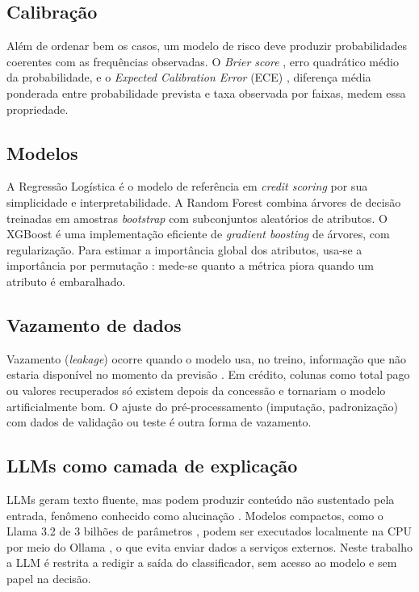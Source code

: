 \documentclass[12pt]{article}
\begin{document}
\subsection{Calibração}

Além de ordenar bem os casos, um modelo de risco deve produzir probabilidades
coerentes com as frequências observadas. O \textit{Brier score}
\cite{brier1950verification}, erro quadrático médio da probabilidade, e o
\textit{Expected Calibration Error} (ECE) \cite{naeini2015obtaining,guo2017calibration},
diferença média ponderada entre probabilidade prevista e taxa observada por
faixas, medem essa propriedade.

\subsection{Modelos}

A Regressão Logística \cite{hosmer2013applied} é o modelo de referência em
\textit{credit scoring} por sua simplicidade e interpretabilidade. A Random
Forest \cite{breiman2001random} combina árvores de decisão treinadas em amostras
\textit{bootstrap} com subconjuntos aleatórios de atributos. O XGBoost
\cite{chen2016xgboost} é uma implementação eficiente de \textit{gradient
boosting} de árvores, com regularização. Para estimar a importância global dos
atributos, usa-se a importância por permutação \cite{breiman2001random}: mede-se
quanto a métrica piora quando um atributo é embaralhado.

\subsection{Vazamento de dados}

Vazamento (\textit{leakage}) ocorre quando o modelo usa, no treino, informação
que não estaria disponível no momento da previsão \cite{kaufman2012leakage}. Em
crédito, colunas como total pago ou valores recuperados só existem depois da
concessão e tornariam o modelo artificialmente bom. O ajuste do
pré-processamento (imputação, padronização) com dados de validação ou teste é
outra forma de vazamento.

\subsection{LLMs como camada de explicação}

LLMs geram texto fluente, mas podem produzir conteúdo não sustentado pela
entrada, fenômeno conhecido como alucinação \cite{ji2023survey}. Modelos
compactos, como o Llama 3.2 de 3 bilhões de parâmetros
\cite{grattafiori2024llama}, podem ser executados localmente na CPU por meio do
Ollama \cite{ollama}, o que evita enviar dados a serviços externos.
Neste trabalho a LLM é restrita a redigir a saída do classificador, sem acesso ao
modelo e sem papel na decisão.
\end{document}
